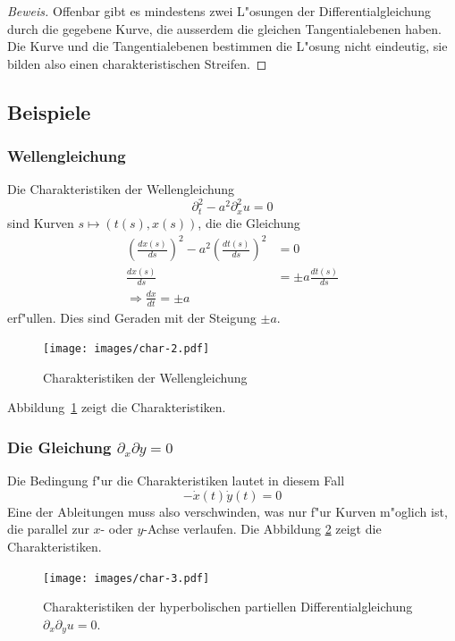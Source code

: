 \begin{proof}[Beweis]
Offenbar gibt es mindestens zwei L"osungen der Differentialgleichung
durch die gegebene Kurve, die ausserdem die gleichen Tangentialebenen
haben. Die Kurve und die Tangentialebenen bestimmen die L"osung nicht
eindeutig, sie bilden also einen charakteristischen Streifen.
\end{proof}

\subsection{Beispiele}
\subsubsection{Wellengleichung}
Die Charakteristiken der Wellengleichung
\[
\partial_t^2-a^2\partial_x^2u=0
\]
sind Kurven $s\mapsto(t(s),x(s))$, die die Gleichung
\begin{align*}
\left(
\frac{dx(s)}{ds}\right)^2-a^2\left(\frac{dt(s)}{ds}\right)^2&=0
\\
\frac{dx(s)}{ds}
&=
\pm a\frac{dt(s)}{ds}
\\
\Rightarrow
\frac{dx}{dt}=\pm a
\end{align*}
erf"ullen. Dies sind Geraden mit der Steigung $\pm a$.
\begin{figure}
\begin{center}
\texttt{[image: images/char-2.pdf]}
\end{center}
\caption{Charakteristiken der Wellengleichung
\label{hyp:wellen}}
\end{figure}
Abbildung~\ref{hyp:wellen} zeigt die Charakteristiken.

\subsubsection{Die Gleichung $\partial_x\partial y=0$} Die Bedingung f"ur die
Charakteristiken lautet in diesem Fall
\[
-\dot x(t)\dot y(t)=0
\]
Eine der Ableitungen muss also verschwinden, was nur f"ur Kurven
m"oglich ist, die parallel zur $x$- oder $y$-Achse verlaufen.
Die Abbildung \ref{hyp:dxdy} zeigt die Charakteristiken.
\begin{figure}
\begin{center}
\texttt{[image: images/char-3.pdf]}
\end{center}
\caption{Charakteristiken der hyperbolischen
partiellen Differentialgleichung
$\partial_x\partial_yu=0$.
\label{hyp:dxdy}}
\end{figure}

